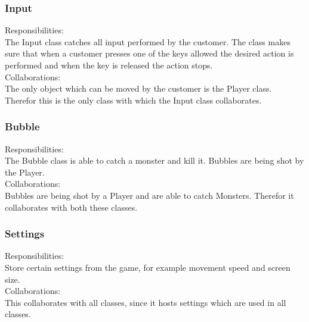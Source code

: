 \subsubsection{Input}
Responsibilities: \\
The Input class catches all input performed by the customer. The class makes sure that when a customer presses one of the keys allowed the desired action is performed and when the key is released the action stops. \\
Collaborations: \\
The only object which can be moved by the customer is the Player class. Therefor this is the only class with which the Input class collaborates. 

\subsubsection{Bubble}
Responsibilities: \\
The Bubble class is able to catch a monster and kill it. Bubbles are being shot by the Player. \\
Collaborations: \\
Bubbles are being shot by a Player and are able to catch Monsters. Therefor it collaborates with both these classes. 

\subsubsection{Settings}
Responsibilities: \\
Store certain settings from the game, for example movement speed and screen size. \\
Collaborations: \\
This collaborates with all classes, since it hosts settings which are used in all classes. 